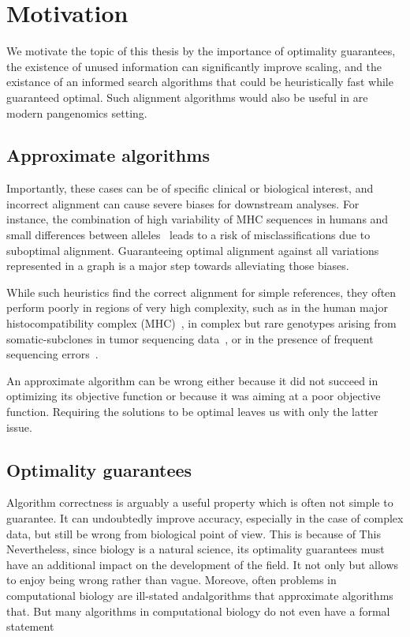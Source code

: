 \section*{Motivation}

We motivate the topic of this thesis by the importance of optimality guarantees,
the existence of unused information can significantly improve scaling, and the
existance of an informed search algorithms that could be heuristically fast
while guaranteed optimal. Such alignment algorithms would also be useful in are
modern pangenomics setting.

\subsection*{Approximate algorithms}

Importantly, these cases can be of specific clinical or biological interest, and
incorrect alignment can cause severe biases for downstream analyses. For
instance, the combination of high variability of MHC sequences in humans and
small differences between alleles~\cite{buhler_hla_2011} leads to a risk of
misclassifications due to suboptimal alignment. Guaranteeing optimal alignment
against all variations represented in a graph is a major step towards
alleviating those biases.

While such heuristics find the correct alignment for simple references, they
often perform poorly in regions of very high complexity, such as in the human
major histocompatibility complex (MHC)~\cite{dilthey_improved_2015}, in complex
but rare genotypes arising from somatic-subclones in tumor sequencing
data~\cite{harismendy_detection_2011}, or in the presence of frequent sequencing
errors~\cite{salmela_lordec_2014}.

An approximate algorithm can be wrong either because it did not succeed in
optimizing its objective function or because it was aiming at a poor objective
function. Requiring the solutions to be optimal leaves us with only the latter
issue.

\subsection*{Optimality guarantees}

Algorithm correctness is arguably a useful property which is often not simple to
guarantee. It can undoubtedly improve accuracy, especially in the case of
complex data, but still be wrong from biological point of view. This is because
of  This Nevertheless, since biology is a natural science, its  optimality
guarantees must have an additional impact on the development of the field. It
not only but allows to enjoy being wrong rather than vague. Moreove, often
problems in computational biology are ill-stated andalgorithms that approximate
algorithms that. But many algorithms in computational biology do not even have a
formal statement 

